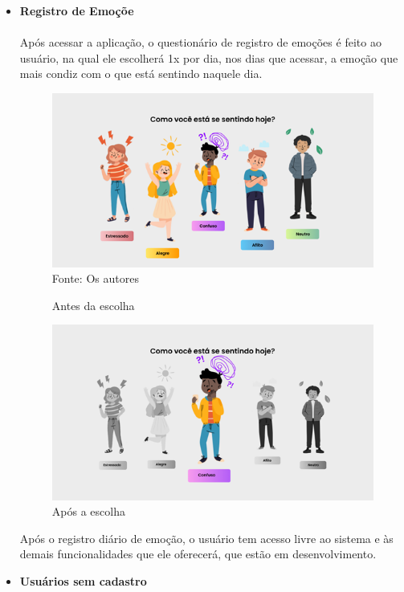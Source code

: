 \documentclass[12pt,a4paper]{article}
\begin{document}
\begin{itemize}
    \item \textbf{Registro de Emoçõe} \\ \\ 
    Após acessar a aplicação, o questionário de registro de emoções é feito ao usuário, na qual ele escolherá 1x por dia, nos dias que acessar, a emoção que mais condiz com o que está sentindo naquele dia. 
          \begin{figure}[H]
                    \centering
                    \caption{Antes da escolha}
                    \includegraphics[width=15cm]{prot9.png}
                    Fonte: Os autores
                \end{figure}
            \begin{figure}[H]
                \centering
                \caption{Após a escolha}
                \includegraphics[width=15cm]{prot10.png}
            \end{figure} 
        Após o registro diário de emoção, o usuário tem acesso livre ao sistema e às demais funcionalidades que ele oferecerá, que estão em desenvolvimento. \\
    \item \textbf{Usuários sem cadastro} \\ \\

\end{itemize}
\end{document}
